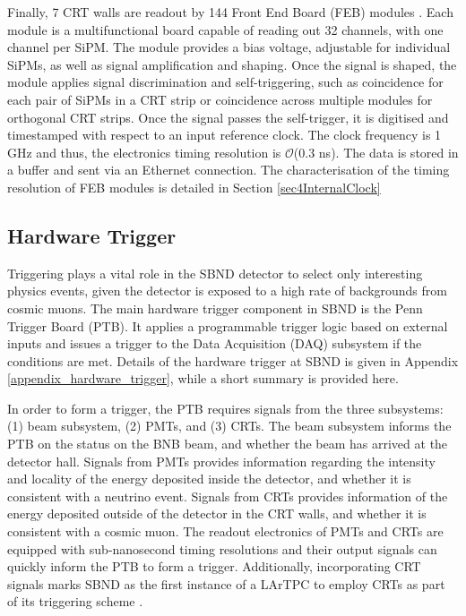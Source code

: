Finally, 7 CRT walls are readout by 144 Front End Board (FEB) modules \cite{crt_note}.%
Each module is a multifunctional board capable of reading out 32 channels, with one channel per SiPM. 
The module provides a bias voltage, adjustable for individual SiPMs, as well as signal amplification and shaping.
Once the signal is shaped, the module applies signal discrimination and self-triggering, such as coincidence for each pair of SiPMs in a CRT strip or coincidence across multiple modules for orthogonal CRT strips. 
Once the signal passes the self-trigger, it is digitised and timestamped with respect to an input reference clock. 
The clock frequency is 1 GHz and thus, the electronics timing resolution is $\mathcal{O}$(0.3 ns).
The data is stored in a buffer and sent via an Ethernet connection. 
The characterisation of the timing resolution of FEB modules is detailed in Section \ref{sec4InternalClock}

\subsection{Hardware Trigger}
\label{sec:sbnd_trigger}

Triggering plays a vital role in the SBND detector to select only interesting physics events, given the detector is exposed to a high rate of backgrounds from cosmic muons. 
The main hardware trigger component in SBND is the Penn Trigger Board (PTB).
It applies a programmable trigger logic based on external inputs and issues a trigger to the Data Acquisition (DAQ) subsystem if the conditions are met.
Details of the hardware trigger at SBND is given in Appendix \ref{appendix_hardware_trigger}, while a short summary is provided here.

In order to form a trigger, the PTB requires signals from the three subsystems: (1) beam subsystem, (2) PMTs, and (3) CRTs.
The beam subsystem informs the PTB on the status on the BNB beam, and whether the beam has arrived at the detector hall.
Signals from PMTs provides information regarding the intensity and locality of the energy deposited inside the detector, and whether it is consistent with a neutrino event.
Signals from CRTs provides information of the energy deposited outside of the detector in the CRT walls, and whether it is consistent with a cosmic muon. 
The readout electronics of PMTs and CRTs are equipped with sub-nanosecond timing resolutions and their output signals can quickly inform the PTB to form a trigger.
Additionally, incorporating CRT signals marks SBND as the first instance of a LArTPC to employ CRTs as part of its triggering scheme \cite{CPAD2022}.

